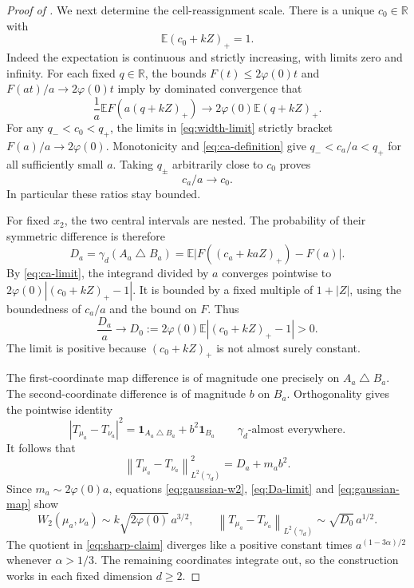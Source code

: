 \documentclass[11pt]{article}
\numberwithin{equation}{section}
\theoremstyle{remark}
\newcommand{\R}{\mathbb R}
\newcommand{\E}{\mathbb E}
\newcommand{\ind}{\mathbf 1}
\newcommand{\norm}[1]{\left\lVert #1\right\rVert}
\begin{document}
\begin{proof}[Proof of ]
We next determine the cell-reassignment scale. There is a unique $c_0\in\R$ with
\begin{equation}\label{eq:c0}
 \E(c_0+kZ)_+=1.
\end{equation}
Indeed the expectation is continuous and strictly increasing, with limits zero and infinity. For each fixed $q\in\R$, the bounds
$F(t)\le2\varphi(0)t$ and $F(at)/a\to2\varphi(0)t$ imply by dominated convergence that
\begin{equation}\label{eq:width-limit}
 \frac1a\E F(a(q+kZ)_+)
 \longrightarrow 2\varphi(0)\E(q+kZ)_+.
\end{equation}
For any $q_-<c_0<q_+$, the limits in \eqref{eq:width-limit} strictly bracket $F(a)/a\to2\varphi(0)$. Monotonicity and \eqref{eq:ca-definition} give $q_-<c_a/a<q_+$ for all sufficiently small $a$. Taking $q_\pm$ arbitrarily close to $c_0$ proves
\begin{equation}\label{eq:ca-limit}
 c_a/a\longrightarrow c_0.
\end{equation}
In particular these ratios stay bounded.

For fixed $x_2$, the two central intervals are nested. The probability of their symmetric difference is therefore
\[
 D_a=\gamma_d(A_a\mathbin\triangle B_a)
 =\E\bigl|F((c_a+kaZ)_+)-F(a)\bigr|.
\]
By \eqref{eq:ca-limit}, the integrand divided by $a$ converges pointwise to $2\varphi(0)|(c_0+kZ)_+-1|$. It is bounded by a fixed multiple of $1+|Z|$, using the boundedness of $c_a/a$ and the bound on $F$. Thus
\begin{equation}\label{eq:Da-limit}
 \frac{D_a}{a}\longrightarrow
 D_0:=2\varphi(0)\E|(c_0+kZ)_+-1|>0.
\end{equation}
The limit is positive because $(c_0+kZ)_+$ is not almost surely constant.

The first-coordinate map difference is of magnitude one precisely on $A_a\mathbin\triangle B_a$. The second-coordinate difference is of magnitude $b$ on $B_a$. Orthogonality gives the pointwise identity
\[
 |T_{\mu_a}-T_{\nu_a}|^2
 =\ind_{A_a\mathbin\triangle B_a}+b^2\ind_{B_a}
 \qquad\gamma_d\text{-almost everywhere}.
\]
It follows that
\begin{equation}\label{eq:gaussian-map}
 \norm{T_{\mu_a}-T_{\nu_a}}_{L^2(\gamma_d)}^2=D_a+m_ab^2.
\end{equation}
Since $m_a\sim2\varphi(0)a$, equations \eqref{eq:gaussian-w2}, \eqref{eq:Da-limit} and \eqref{eq:gaussian-map} show
\[
 W_2(\mu_a,\nu_a)\sim k\sqrt{2\varphi(0)}\,a^{3/2},
 \qquad
 \norm{T_{\mu_a}-T_{\nu_a}}_{L^2(\gamma_d)}\sim\sqrt{D_0}\,a^{1/2}.
\]
The quotient in \eqref{eq:sharp-claim} diverges like a positive constant times $a^{(1-3\alpha)/2}$ whenever $\alpha>1/3$. The remaining coordinates integrate out, so the construction works in each fixed dimension $d\ge2$.
\end{proof}
\end{document}
